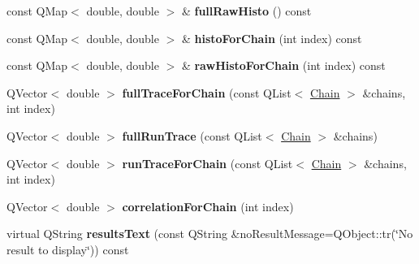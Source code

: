 \begin{DoxyCompactItemize}
\item 
\hypertarget{class_metropolis_variable_abfbb7efef12bcb69015becc10c72ff4b}{const Q\-Map$<$ double, double $>$ \& {\bfseries full\-Raw\-Histo} () const }\label{class_metropolis_variable_abfbb7efef12bcb69015becc10c72ff4b}

\item 
\hypertarget{class_metropolis_variable_afada91422c23358637fcf156aa7ba40f}{const Q\-Map$<$ double, double $>$ \& {\bfseries histo\-For\-Chain} (int index) const }\label{class_metropolis_variable_afada91422c23358637fcf156aa7ba40f}

\item 
\hypertarget{class_metropolis_variable_a821cd9525b19ba959c2629098b7410b0}{const Q\-Map$<$ double, double $>$ \& {\bfseries raw\-Histo\-For\-Chain} (int index) const }\label{class_metropolis_variable_a821cd9525b19ba959c2629098b7410b0}

\item 
\hypertarget{class_metropolis_variable_ae59fbcb9c5fbd55bc8b1be5a619f4618}{Q\-Vector$<$ double $>$ {\bfseries full\-Trace\-For\-Chain} (const Q\-List$<$ \hyperlink{struct_chain}{Chain} $>$ \&chains, int index)}\label{class_metropolis_variable_ae59fbcb9c5fbd55bc8b1be5a619f4618}

\item 
\hypertarget{class_metropolis_variable_ad212e41428a5c2e372c8e31f62992d59}{Q\-Vector$<$ double $>$ {\bfseries full\-Run\-Trace} (const Q\-List$<$ \hyperlink{struct_chain}{Chain} $>$ \&chains)}\label{class_metropolis_variable_ad212e41428a5c2e372c8e31f62992d59}

\item 
\hypertarget{class_metropolis_variable_a7ef3725cb2366425c93699120f4fb6cb}{Q\-Vector$<$ double $>$ {\bfseries run\-Trace\-For\-Chain} (const Q\-List$<$ \hyperlink{struct_chain}{Chain} $>$ \&chains, int index)}\label{class_metropolis_variable_a7ef3725cb2366425c93699120f4fb6cb}

\item 
\hypertarget{class_metropolis_variable_a885e3d7317504d6813f0c0b049d9ecb3}{Q\-Vector$<$ double $>$ {\bfseries correlation\-For\-Chain} (int index)}\label{class_metropolis_variable_a885e3d7317504d6813f0c0b049d9ecb3}

\item 
\hypertarget{class_metropolis_variable_adaeecc2bc5b3d7b80382ad22fb90b553}{virtual Q\-String {\bfseries results\-Text} (const Q\-String \&no\-Result\-Message=Q\-Object\-::tr(\char`\"{}No result to display\char`\"{})) const }\label{class_metropolis_variable_adaeecc2bc5b3d7b80382ad22fb90b553}

\end{DoxyCompactItemize}
